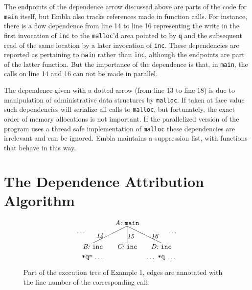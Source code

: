 \documentclass{acm_proc_article-sp}
\begin{document}
The endpoints of the dependence arrow discussed above are parts of
the code for {\tt main} itself, but Embla also tracks references made 
in function calls. For
instance, there is a flow dependence from line 14 to line 16
representing the write in the first invocation of {\tt inc} to the 
{\tt malloc}'d area pointed to by {\tt q} and the subsequent read 
of the same location by a later invocation of {\tt inc}. 
These dependencies 
are reported as pertaining to {\tt main} rather than {\tt inc},
although the endpoints are part of the latter function. 
But the importance of the dependence is that, in {\tt main}, the calls
on line 14 and 16 can not be made in parallel.

The dependence given with a dotted arrow 
(from line 13 to line 18) is due to manipulation of administrative 
data structures by {\tt malloc}. If taken at face value such dependencies will
serialize all calls to {\tt malloc}, but fortunately, the exact order
of memory allocations is not important. If the 
parallelized version of the program uses a thread safe 
implementation of {\tt malloc} these dependencies are irrelevant and
can be ignored. Embla maintains a suppression list, with functions that behave 
in this way.





\section{The Dependence Attribution Algorithm}

\begin{figure} \small
\hrulefill
\[
\begin{picture}(160,60)(70,15)
\put(120,65){\makebox(60,10)[c]{\it A:\ \tt main}}
\put(150,65){\line(-2,-1){50}}
\put(150,65){\line( 0,-1){25}}
\put(150,65){\line( 2,-1){50}}
\put(95,45){\makebox(20,10)[r]{\it 14}}
\put(150,45){\makebox(20,10)[l]{\it 15}}
\put(185,45){\makebox(20,10)[l]{\it 16}}
\put(70,50){\makebox(20,10)[r]{\ldots}}
\put(210,50){\makebox(20,10)[l]{\ldots}}
\put(170,30){\makebox(60,10)[c]{\it D:\ \tt inc}}
\put(120,30){\makebox(60,10)[c]{\it C:\ \tt inc}}
\put(70,30){\makebox(60,10)[c]{\it B:\ \tt inc}}
\put(70,15){\makebox(60,10)[cb]{{\tt *q=}\ \ldots}}
\put(170,15){\makebox(60,10)[cb]{\ldots\ {\tt *q}\ \ldots}}
\end{picture}
\]
\hrulefill
\caption{Part of the execution tree of Example 1, edges are annotated 
with the line number of the corresponding call.} 
\label{ffextree}
\end{figure}
\end{document}
